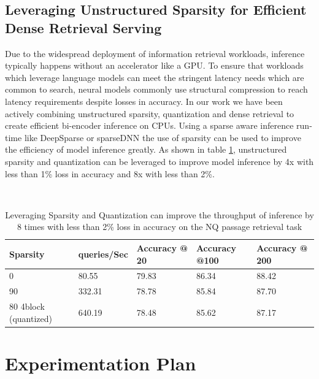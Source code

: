 \subsection{Leveraging Unstructured Sparsity for Efficient Dense Retrieval Serving}
Due to the widespread deployment of information retrieval workloads, inference typically happens without an accelerator like a GPU. To ensure that workloads which leverage language models can meet the stringent latency needs which are common to search, neural models commonly use structural compression to reach latency requirements despite losses in accuracy. In our work we have been actively combining unstructured sparsity, quantization and dense retrieval to create efficient bi-encoder inference on CPUs. Using a sparse aware inference run-time like DeepSparse \cite{deepsparse} or sparseDNN \cite{Wang2021SparseDNNFS} the use of sparsity can be used to improve the efficiency of model inference greatly. As shown in table \ref{tab:sparse-ir}, unstructured sparsity and quantization can be leveraged to improve model inference by 4x with less than 1\% loss in accuracy and 8x with less than 2\%.
\begin{table}[!htb]
    \centering
    \
    \begin{tabular}{|l|l|l|l|l|}
    \hline
        Sparsity & queries/Sec & Accuracy @ 20  & Accuracy @100 & Accuracy @ 200 \\ \hline
        0 & 80.55 & 79.83 & 86.34 & 88.42 \\ \hline
        90 & 332.31 & 78.78 & 85.84 & 87.70 \\ \hline
        80 4block (quantized) & 640.19 & 78.48 & 85.62 & 87.17 \\ \hline
    \end{tabular}
    \caption{Leveraging Sparsity and Quantization can improve the throughput of inference by 8 times with less than 2\% loss in accuracy on the NQ \cite{Kwiatkowski2019NaturalQA} passage retrieval task}
    \label{tab:sparse-ir}
\end{table}

\section{Experimentation Plan}
